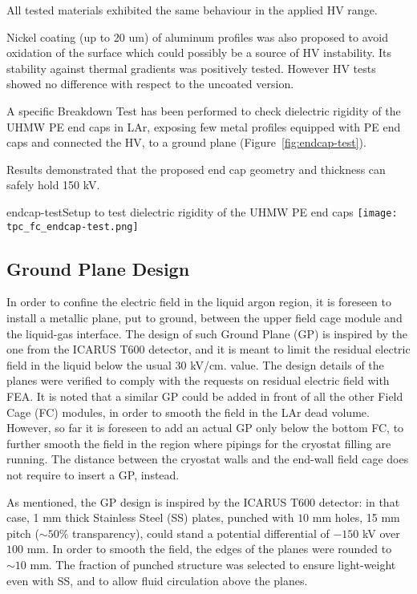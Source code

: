 All tested materials exhibited the same behaviour in the applied HV range. 

Nickel coating (up to 20 um) of aluminum profiles was also proposed  to avoid oxidation of the surface which could possibly be a source of HV instability. Its stability against  thermal gradients was positively tested. However HV tests showed no difference with respect to the uncoated version.

A specific Breakdown Test has been performed to check dielectric rigidity of the UHMW PE end caps in LAr, exposing few metal profiles equipped with PE end caps and connected the HV, to a ground plane (Figure~\ref{fig:endcap-test}).

Results demonstrated that the proposed end cap geometry and thickness can safely hold 150 kV.

\begin{cdrfigure}{endcap-test}{Setup to test dielectric rigidity of the UHMW PE end caps}
\texttt{[image: tpc\_fc\_endcap-test.png]}
\end{cdrfigure}





\subsection{Ground Plane Design}

In order to confine the electric field in the liquid argon region, it is foreseen to install a metallic plane, put to ground, between the upper field cage module and the liquid-gas interface. The design of such Ground Plane (GP) is inspired by the one from the ICARUS T600 detector, and it is meant to limit the residual electric field in the liquid below the usual 30 kV/cm. value. The design details of the planes were verified to comply with the requests on residual electric field with FEA. It is noted that a similar GP could be added in front of all the other Field Cage (FC) modules, in order to smooth the field in the LAr dead volume. However, so far it is foreseen to add an actual GP only below the bottom FC, to further smooth the field in the region where pipings for the cryostat filling are running. The distance between the cryostat walls and the end-wall field cage does not require to insert a GP, instead.

As mentioned, the GP design is inspired by the ICARUS T600 detector: in that case, 1 mm thick Stainless Steel (SS) plates, punched with $10$ mm holes, 15 mm pitch ($\sim 50\%$ transparency), could stand a potential differential of $-150$ kV over $100$ mm. In order to smooth the field, the edges of the planes were rounded to $\sim 10$ mm. The fraction of punched structure was selected to ensure light-weight even with SS, and to allow fluid circulation above the planes.

